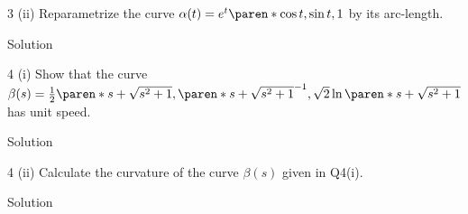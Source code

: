 \documentclass[11pt]{penrose}
\begin{document}
\begin{problem}{3 (ii)}
    Reparametrize the curve $\alpha(t) = e^{t}\paren*{\cos t, \sin t, 1}$ by its arc-length.

    \solution Solution
\end{problem}

\begin{problem}{4 (i)}
    Show that the curve $\beta(s) = \frac{1}{2}\paren*{s + \sqrt{s^2 + 1}, \paren*{s + \sqrt{s^2 + 1}}^{-1}, \sqrt{2}\ln\paren*{s + \sqrt{s^2 + 1}}}$ has unit speed.

    \solution Solution
\end{problem}

\begin{problem}{4 (ii)}
    Calculate the curvature of the curve $\beta(s)$ given in Q4(i).

    \solution Solution
\end{problem}
\end{document}
